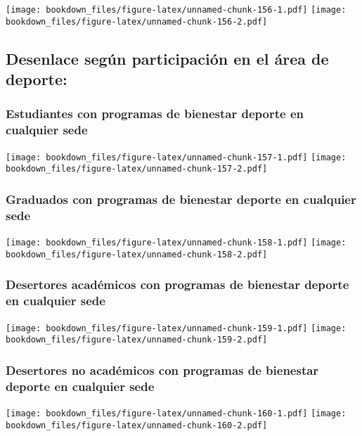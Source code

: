 \documentclass[]{article}
\theoremstyle{definition}
\theoremstyle{definition}
\theoremstyle{definition}
\theoremstyle{remark}
\begin{document}
\texttt{[image: bookdown\_files/figure-latex/unnamed-chunk-156-1.pdf]}
\texttt{[image: bookdown\_files/figure-latex/unnamed-chunk-156-2.pdf]}

\subsection{Desenlace según participación en el área de
deporte:}\label{desenlace-segun-participacion-en-el-area-de-deporte}

\subsubsection{Estudiantes con programas de bienestar deporte en
cualquier
sede}\label{estudiantes-con-programas-de-bienestar-deporte-en-cualquier-sede}

\texttt{[image: bookdown\_files/figure-latex/unnamed-chunk-157-1.pdf]}
\texttt{[image: bookdown\_files/figure-latex/unnamed-chunk-157-2.pdf]}

\subsubsection{Graduados con programas de bienestar deporte en cualquier
sede}\label{graduados-con-programas-de-bienestar-deporte-en-cualquier-sede}

\texttt{[image: bookdown\_files/figure-latex/unnamed-chunk-158-1.pdf]}
\texttt{[image: bookdown\_files/figure-latex/unnamed-chunk-158-2.pdf]}

\subsubsection{Desertores académicos con programas de bienestar deporte
en cualquier
sede}\label{desertores-academicos-con-programas-de-bienestar-deporte-en-cualquier-sede}

\texttt{[image: bookdown\_files/figure-latex/unnamed-chunk-159-1.pdf]}
\texttt{[image: bookdown\_files/figure-latex/unnamed-chunk-159-2.pdf]}

\subsubsection{Desertores no académicos con programas de bienestar
deporte en cualquier
sede}\label{desertores-no-academicos-con-programas-de-bienestar-deporte-en-cualquier-sede}

\texttt{[image: bookdown\_files/figure-latex/unnamed-chunk-160-1.pdf]}
\texttt{[image: bookdown\_files/figure-latex/unnamed-chunk-160-2.pdf]}
\end{document}
